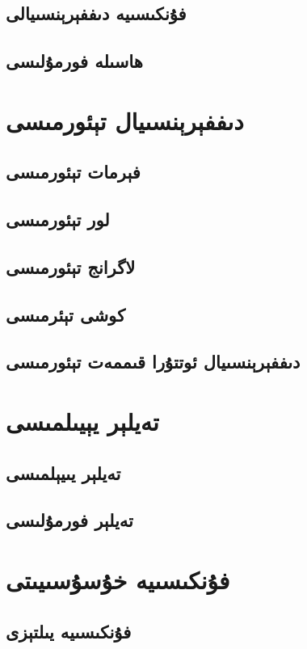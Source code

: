 \subsection{فۇنكىسىيە دىففېرېنسىيالى}
\subsection{ھاسىلە فورمۇلىسى}


\section{دىففېرېنسىيال تېئورمىسى}
\subsection{فېرمات تېئورمىسى}
\subsection{لور تېئورمىسى}
\subsection{لاگرانج تېئورمىسى}
\subsection{كوشى تېئرمىسى}
\subsection{دىففېرېنسىيال ئوتتۇرا قىممەت تېئورمىسى}

\section{تەيلېر يېيىلمىسى}
\subsection{تەيلېر يىيېلمىسى}
\subsection{تەيلېر فورمۇلىسى}

\section{فۇنكىسىيە خۇسۇسىيىتى}
\subsection{فۇنكىسىيە يىلتېزى}

